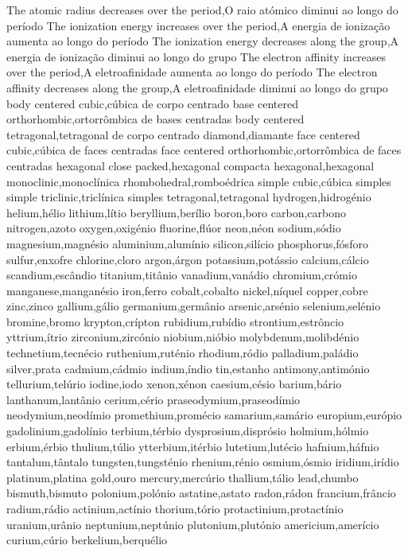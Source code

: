 The atomic radius decreases over the period,O raio atómico diminui ao longo do período
The ionization energy increases over the period,A energia de ionização aumenta ao longo do período
The ionization energy decreases along the group,A energia de ionização diminui ao longo do grupo
The electron affinity increases over the period,A eletroafinidade aumenta ao longo do período
The electron affinity decreases along the group,A eletroafinidade diminui ao longo do grupo
body centered cubic,cúbica de corpo centrado
base centered orthorhombic,ortorrômbica de bases centradas
body centered tetragonal,tetragonal de corpo centrado
diamond,diamante
face centered cubic,cúbica de faces centradas
face centered orthorhombic,ortorrômbica de faces centradas
hexagonal close packed,hexagonal compacta
hexagonal,hexagonal
monoclinic,monoclínica
rhombohedral,romboédrica
simple cubic,cúbica simples
simple triclinic,triclínica simples
tetragonal,tetragonal
hydrogen,hidrogénio
helium,hélio
lithium,lítio
beryllium,berílio
boron,boro
carbon,carbono
nitrogen,azoto
oxygen,oxigénio
fluorine,flúor
neon,néon
sodium,sódio
magnesium,magnésio
aluminium,alumínio
silicon,silício
phosphorus,fósforo
sulfur,enxofre
chlorine,cloro
argon,árgon
potassium,potássio
calcium,cálcio
scandium,escândio
titanium,titânio
vanadium,vanádio
chromium,crómio
manganese,manganésio
iron,ferro
cobalt,cobalto
nickel,níquel
copper,cobre
zinc,zinco
gallium,gálio
germanium,germânio
arsenic,arsénio
selenium,selénio
bromine,bromo
krypton,crípton
rubidium,rubídio
strontium,estrôncio
yttrium,ítrio
zirconium,zircónio
niobium,nióbio
molybdenum,molibdénio
technetium,tecnécio
ruthenium,ruténio
rhodium,ródio
palladium,paládio
silver,prata
cadmium,cádmio
indium,índio
tin,estanho
antimony,antimónio
tellurium,telúrio
iodine,iodo
xenon,xénon
caesium,césio
barium,bário
lanthanum,lantânio
cerium,cério
praseodymium,praseodímio
neodymium,neodímio
promethium,promécio
samarium,samário
europium,európio
gadolinium,gadolínio
terbium,térbio
dysprosium,disprósio
holmium,hólmio
erbium,érbio
thulium,túlio
ytterbium,itérbio
lutetium,lutécio
hafnium,háfnio
tantalum,tântalo
tungsten,tungsténio
rhenium,rénio
osmium,ósmio
iridium,irídio
platinum,platina
gold,ouro
mercury,mercúrio
thallium,tálio
lead,chumbo
bismuth,bismuto
polonium,polónio
astatine,astato
radon,rádon
francium,frâncio
radium,rádio
actinium,actínio
thorium,tório
protactinium,protactínio
uranium,urânio
neptunium,neptúnio
plutonium,plutónio
americium,amerício
curium,cúrio
berkelium,berquélio
